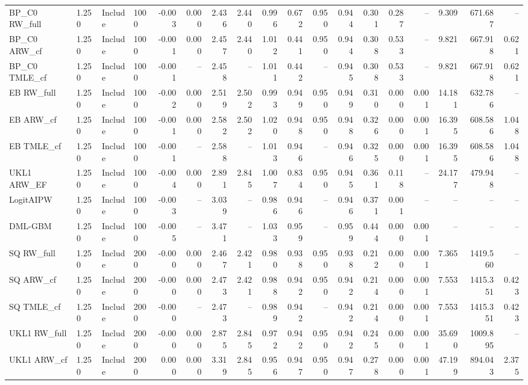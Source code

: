 \begin{tabular}{llllrrrrrrrrrrrrrr}
BP\_C0 RW\_full & 1.250 & Include & 1000 & -0.003 & 0.000 & 2.436 & 2.440 & 0.996 & 0.672 & 0.950 & 0.944 & 0.301 & 0.287 & -- & 9.309 & 671.687 & -- \\
BP\_C0 ARW\_cf & 1.250 & Include & 1000 & -0.001 & 0.000 & 2.457 & 2.440 & 1.012 & 0.441 & 0.950 & 0.944 & 0.308 & 0.533 & -- & 9.821 & 667.918 & 0.621 \\
BP\_C0 TMLE\_cf & 1.250 & Include & 1000 & -0.001 & -- & 2.458 & -- & 1.011 & 0.442 & -- & 0.945 & 0.308 & 0.533 & -- & 9.821 & 667.918 & 0.621 \\
EB RW\_full & 1.250 & Include & 1000 & -0.002 & 0.000 & 2.519 & 2.502 & 0.993 & 0.949 & 0.950 & 0.949 & 0.310 & 0.000 & 0.001 & 14.181 & 632.786 & -- \\
EB ARW\_cf & 1.250 & Include & 1000 & -0.001 & 0.000 & 2.582 & 2.502 & 1.020 & 0.948 & 0.950 & 0.948 & 0.326 & 0.000 & 0.001 & 16.395 & 608.586 & 1.048 \\
EB TMLE\_cf & 1.250 & Include & 1000 & -0.001 & -- & 2.588 & -- & 1.013 & 0.946 & -- & 0.946 & 0.325 & 0.000 & 0.001 & 16.395 & 608.586 & 1.048 \\
UKL1 ARW\_EF & 1.250 & Include & 1000 & -0.004 & 0.000 & 2.891 & 2.845 & 1.007 & 0.834 & 0.950 & 0.945 & 0.361 & 0.118 & -- & 24.177 & 479.948 & -- \\
LogitAIPW & 1.250 & Include & 1000 & -0.003 & -- & 3.039 & -- & 0.986 & 0.946 & -- & 0.946 & 0.371 & 0.001 & -- & -- & -- & -- \\
DML-GBM & 1.250 & Include & 1000 & -0.005 & -- & 3.471 & -- & 1.033 & 0.959 & -- & 0.959 & 0.444 & 0.000 & 0.001 & -- & -- & -- \\
SQ RW\_full & 1.250 & Include & 2000 & -0.000 & 0.000 & 2.467 & 2.421 & 0.980 & 0.938 & 0.950 & 0.938 & 0.212 & 0.000 & 0.001 & 7.365 & 1419.560 & -- \\
SQ ARW\_cf & 1.250 & Include & 2000 & -0.000 & 0.000 & 2.473 & 2.421 & 0.988 & 0.942 & 0.950 & 0.942 & 0.214 & 0.000 & 0.001 & 7.553 & 1415.351 & 0.423 \\
SQ TMLE\_cf & 1.250 & Include & 2000 & -0.000 & -- & 2.473 & -- & 0.989 & 0.942 & -- & 0.942 & 0.214 & 0.000 & 0.001 & 7.553 & 1415.351 & 0.423 \\
UKL1 RW\_full & 1.250 & Include & 2000 & -0.000 & 0.000 & 2.875 & 2.845 & 0.972 & 0.942 & 0.950 & 0.942 & 0.245 & 0.000 & 0.001 & 35.690 & 1009.895 & -- \\
UKL1 ARW\_cf & 1.250 & Include & 2000 & 0.000 & 0.000 & 3.319 & 2.845 & 0.956 & 0.947 & 0.950 & 0.947 & 0.278 & 0.000 & 0.001 & 47.199 & 894.043 & 2.375 \\

\end{tabular}
